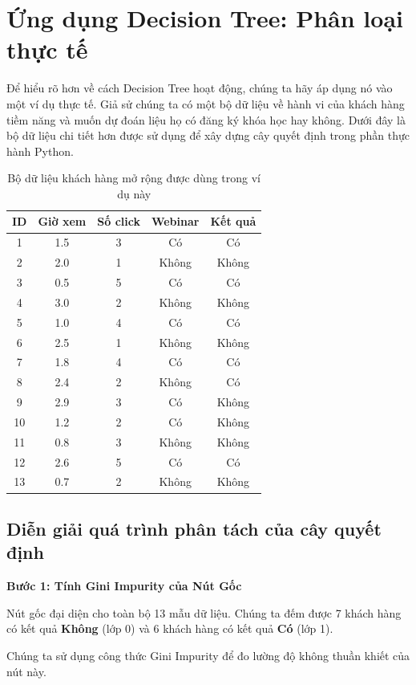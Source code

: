 \section{Ứng dụng Decision Tree: Phân loại thực tế}
Để hiểu rõ hơn về cách Decision Tree hoạt động, chúng ta hãy áp dụng nó vào một ví dụ thực tế. Giả sử chúng ta có một bộ dữ liệu về hành vi của khách hàng tiềm năng và muốn dự đoán liệu họ có đăng ký khóa học hay không. Dưới đây là bộ dữ liệu chi tiết hơn được sử dụng để xây dựng cây quyết định trong phần thực hành Python.

\begin{table}[H]
\centering
\begin{tabular}{|c|c|c|c|c|}
\hline
\textbf{ID} & \textbf{Giờ xem} & \textbf{Số click} & \textbf{Webinar} & \textbf{Kết quả} \\
\hline
1 & 1.5 & 3 & Có & Có \\
2 & 2.0 & 1 & Không & Không \\
3 & 0.5 & 5 & Có & Có \\
4 & 3.0 & 2 & Không & Không \\
5 & 1.0 & 4 & Có & Có \\
6 & 2.5 & 1 & Không & Không \\
7 & 1.8 & 4 & Có & Có \\
8 & 2.4 & 2 & Không & Có \\
9 & 2.9 & 3 & Có & Không \\
10 & 1.2 & 2 & Có & Không \\
11 & 0.8 & 3 & Không & Không \\
12 & 2.6 & 5 & Có & Có \\
13 & 0.7 & 2 & Không & Không \\
\hline
\end{tabular}
\caption{Bộ dữ liệu khách hàng mở rộng được dùng trong ví dụ này}
\label{tab:extended_data}
\end{table}

\subsection{Diễn giải quá trình phân tách của cây quyết định}

\textbf{Bước 1: Tính Gini Impurity của Nút Gốc}

Nút gốc đại diện cho toàn bộ 13 mẫu dữ liệu. Chúng ta đếm được 7 khách hàng có kết quả \textbf{Không} (lớp 0) và 6 khách hàng có kết quả \textbf{Có} (lớp 1).

Chúng ta sử dụng công thức Gini Impurity để đo lường độ không thuần khiết của nút này.

